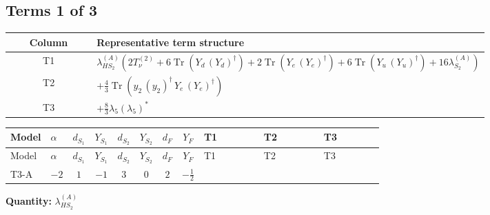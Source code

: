 \documentclass[8pt]{article}
\begin{document}
\begin{landscape}
\subsection*{Terms 1 of 3}
\begin{center}
\begin{tabular}{@{}c >{\raggedright\arraybackslash}p{0.82\linewidth}@{}}
\toprule
Column & Representative term structure \\
\midrule
T1 & \(\displaystyle {\lambda_{HS_2}^{(A)}} (2 T_{\nu}^{(2)}+6 \operatorname{Tr}\!\left({Y_d}\,\left({Y_d}\right)^{\dagger}\right)+2 \operatorname{Tr}\!\left({Y_e}\,\left({Y_e}\right)^{\dagger}\right)+6 \operatorname{Tr}\!\left({Y_u}\,\left({Y_u}\right)^{\dagger}\right)+16 {\lambda_{S_2}^{(A)}})\) \\
\midrule
T2 & \(\displaystyle +\frac{4}{3} \operatorname{Tr}\!\left({y_2}\,\left({y_2}\right)^{\dagger}\,{Y_e}\,\left({Y_e}\right)^{\dagger}\right)\) \\
\midrule
T3 & \(\displaystyle +\frac{8}{3} {\lambda_5} \left({\lambda_5}\right)^{*}\) \\
\midrule
\bottomrule
\end{tabular}
\end{center}
\smallskip
\tiny
\begin{longtable}{@{}llcccccc >{\raggedright\arraybackslash}p{0.21\linewidth} >{\raggedright\arraybackslash}p{0.21\linewidth} >{\raggedright\arraybackslash}p{0.21\linewidth}@{}}
\toprule
Model & $\alpha$ & $d_{S_1}$ & $Y_{S_1}$ & $d_{S_2}$ & $Y_{S_2}$ & $d_F$ & $Y_F$ & T1 & T2 & T3 \\
\midrule
\endfirsthead
\toprule
Model & $\alpha$ & $d_{S_1}$ & $Y_{S_1}$ & $d_{S_2}$ & $Y_{S_2}$ & $d_F$ & $Y_F$ & T1 & T2 & T3 \\
\midrule
\endhead
T3-A & $-2$ & $1$ & $-1$ & $3$ & $0$ & $2$ & $-\frac{1}{2}$ & \scriptsize\adjustbox{max width=\linewidth}{$\begin{gathered} {\lambda_{HS_2}^{(A)}} (2 T_{\nu}^{(2)}+6 \operatorname{Tr}\!\left({Y_d}\,\left({Y_d}\right)^{\dagger}\right)+2 \operatorname{Tr}\!\left({Y_e}\,\left({Y_e}\right)^{\dagger}\right)+6 \operatorname{Tr}\!\left({Y_u}\,\left({Y_u}\right)^{\dagger}\right)+16 {\lambda_{S_2}^{(A)}})\end{gathered}$} & \scriptsize\adjustbox{max width=\linewidth}{$\begin{gathered} +\frac{4}{3} \operatorname{Tr}\!\left({y_2}\,\left({y_2}\right)^{\dagger}\,{Y_e}\,\left({Y_e}\right)^{\dagger}\right)\end{gathered}$} & \scriptsize\adjustbox{max width=\linewidth}{$\begin{gathered} +\frac{8}{3} {\lambda_5} \left({\lambda_5}\right)^{*}\end{gathered}$} \\
\midrule
\bottomrule
\end{longtable}
\clearpage
\noindent\textbf{Quantity: }$\lambda_{HS_2}^{(A)}$\par\smallskip

\end{landscape}
\end{document}
